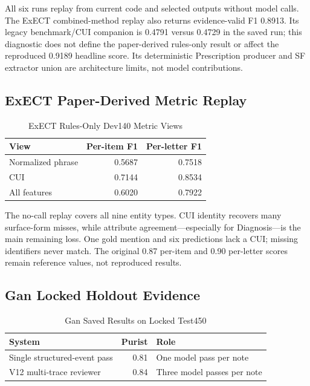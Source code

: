 \documentclass[conference]{IEEEtran}
\begin{document}
All six runs replay from current code and selected outputs without model calls.
The ExECT combined-method replay also returns evidence-valid F1 0.8913. Its legacy
benchmark/CUI companion is 0.4791 versus 0.4729 in the saved run; this diagnostic
does not define the paper-derived rules-only result or affect the reproduced
0.9189 headline score. Its deterministic Prescription producer and SF extractor
union are architecture limits, not model contributions.

\subsection{ExECT Paper-Derived Metric Replay}

\begin{table}[tbp]
\caption{ExECT Rules-Only Dev140 Metric Views}
\label{tab:exect-published}
\centering
\scriptsize
\begin{tabular}{lrr}
\toprule
View & Per-item F1 & Per-letter F1 \\
\midrule
Normalized phrase & 0.5687 & 0.7518 \\
CUI & 0.7144 & 0.8534 \\
All features & 0.6020 & 0.7922 \\
\bottomrule
\end{tabular}
\end{table}

The no-call replay covers all nine entity types. CUI identity recovers many
surface-form misses, while attribute agreement---especially for Diagnosis---is
the main remaining loss. One gold mention and six predictions lack a CUI;
missing identifiers never match. The original 0.87 per-item and 0.90 per-letter
scores remain reference values, not reproduced results.

\subsection{Gan Locked Holdout Evidence}

\begin{table}[tbp]
\caption{Gan Saved Results on Locked Test450}
\label{tab:gan-holdout}
\centering
\scriptsize
\begin{tabular}{lrl}
\toprule
System & Purist & Role \\
\midrule
Single structured-event pass & 0.81 & One model pass per note \\
V12 multi-trace reviewer & 0.84 & Three model passes per note \\
\bottomrule
\end{tabular}
\end{table}
\end{document}
